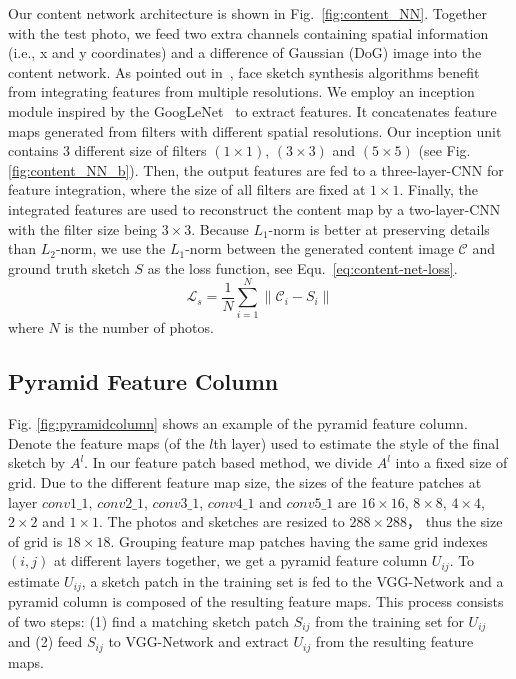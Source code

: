 \documentclass[10pt,twocolumn,letterpaper]{article}
\begin{document}
Our content network architecture is shown in Fig.~\ref{fig:content_NN}. Together with the test photo, we feed two extra channels containing spatial information (i.e., x and y coordinates) and a difference of Gaussian (DoG) image into the content network. As pointed out in~\cite{wang2009face}, face sketch synthesis algorithms benefit from integrating features from multiple resolutions. We employ an inception module inspired by the GoogLeNet~\cite{szegedy2015going} to extract features. It concatenates feature maps generated from filters with different spatial resolutions. Our inception unit contains 3 different size of filters $(1\times1)$, $(3\times3)$ and $(5\times5)$ (see Fig. \ref{fig:content_NN_b}). Then, the output features are fed to a three-layer-CNN for feature integration, where the size of all filters are fixed at $1\times1$. Finally, the integrated features are used to reconstruct the content map by a two-layer-CNN with the filter size being $3\times3$. Because $L_1$-norm is better at preserving details than $L_2$-norm, we use the $L_1$-norm between the generated content image $\mathcal{C}$ and ground truth sketch $S$ as the loss function, see Equ.~\ref{eq:content-net-loss}.
\begin{equation}
\mathcal{L}_s = \frac{1}{N} \sum \limits_{i=1}^N \|\mathcal{C}_i - S_i\| \label{eq:content-net-loss}
\end{equation}
where $N$ is the number of photos. 

\subsection{Pyramid Feature Column} \label{subsec:pyramid_feature_column}

Fig. \ref{fig:pyramidcolumn} shows an example of the pyramid feature column. Denote the feature maps (of the $l$th layer) used to estimate the style of the final sketch by $A^{l}$. In our feature patch based method, we divide $A^{l}$ into a fixed size of grid. Due to the different feature map size, the sizes of the feature patches at layer $conv1\_1$, $conv2\_1$, $conv3\_1$, $conv4\_1$ and $conv5\_1$ are $16\times16$, $8\times8$, $4\times4$, $2\times2$ and $1\times1$. The photos and sketches are resized to $288\times288$， thus the size of grid is $18\times18$. Grouping feature map patches having the same grid indexes $(i, j)$ at different layers together, we get a pyramid feature column $U_{ij}$. To estimate $U_{ij}$, a sketch patch in the training set is fed to the VGG-Network and a pyramid column is composed of the resulting feature maps. This process consists of two steps: (1) find a matching sketch patch $S_{ij}$ from the training set for $U_{ij}$ and (2) feed $S_{ij}$ to VGG-Network and extract $U_{ij}$ from the resulting feature maps.
\end{document}

